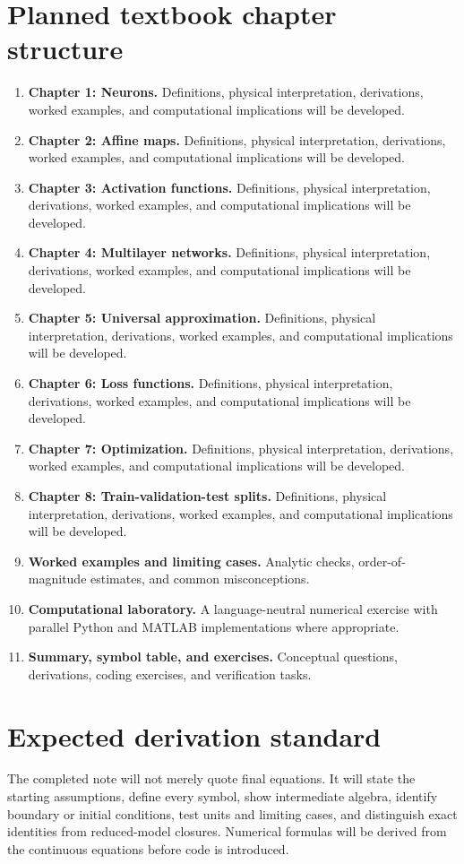 \documentclass[11pt]{article}
\begin{document}
\section{Planned textbook chapter structure}
\begin{enumerate}[leftmargin=1.8em]
\item \textbf{Chapter 1: Neurons.} Definitions, physical interpretation, derivations, worked examples, and computational implications will be developed.
\item \textbf{Chapter 2: Affine maps.} Definitions, physical interpretation, derivations, worked examples, and computational implications will be developed.
\item \textbf{Chapter 3: Activation functions.} Definitions, physical interpretation, derivations, worked examples, and computational implications will be developed.
\item \textbf{Chapter 4: Multilayer networks.} Definitions, physical interpretation, derivations, worked examples, and computational implications will be developed.
\item \textbf{Chapter 5: Universal approximation.} Definitions, physical interpretation, derivations, worked examples, and computational implications will be developed.
\item \textbf{Chapter 6: Loss functions.} Definitions, physical interpretation, derivations, worked examples, and computational implications will be developed.
\item \textbf{Chapter 7: Optimization.} Definitions, physical interpretation, derivations, worked examples, and computational implications will be developed.
\item \textbf{Chapter 8: Train-validation-test splits.} Definitions, physical interpretation, derivations, worked examples, and computational implications will be developed.
\item \textbf{Worked examples and limiting cases.} Analytic checks, order-of-magnitude estimates, and common misconceptions.
\item \textbf{Computational laboratory.} A language-neutral numerical exercise with parallel Python and MATLAB implementations where appropriate.
\item \textbf{Summary, symbol table, and exercises.} Conceptual questions, derivations, coding exercises, and verification tasks.
\end{enumerate}

\section{Expected derivation standard}
The completed note will not merely quote final equations. It will state the starting assumptions, define every symbol, show intermediate algebra, identify boundary or initial conditions, test units and limiting cases, and distinguish exact identities from reduced-model closures. Numerical formulas will be derived from the continuous equations before code is introduced.
\end{document}
